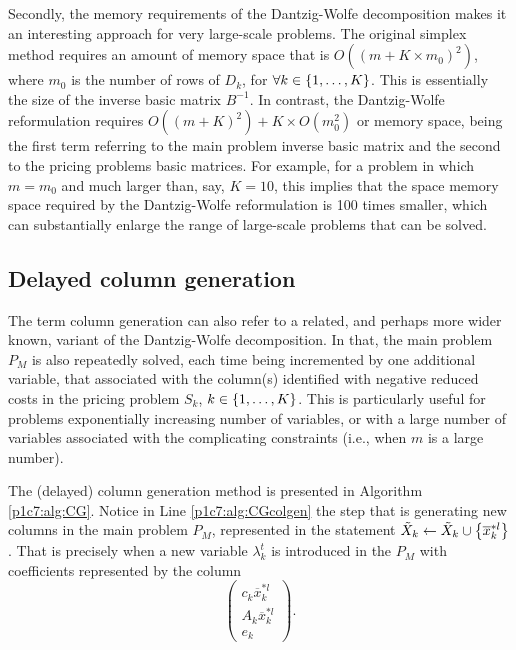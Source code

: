 Secondly, the memory requirements of the Dantzig-Wolfe decomposition makes it an interesting approach for very large-scale problems. The original simplex method requires an amount of memory space that is $O((m + K \times m_0)^2)$, where $m_0$ is the number of rows of $D_k$, for $\forall k \in \left\{ 1,\dots, K \right \}$. This is essentially the size of the inverse basic matrix $B^{-1}$. In contrast, the Dantzig-Wolfe reformulation requires $O((m + K)^2) + K \times O(m_0^2)$ or memory space, being the first term referring to the main problem inverse basic matrix and the second to the pricing problems basic matrices. For example, for a problem in which $m = m_0$ and much larger than, say, $K=10$, this implies that the space memory space required by the Dantzig-Wolfe reformulation is 100 times smaller, which can substantially enlarge the range of large-scale problems that can be solved.


\subsection{Delayed column generation}
 
The term column generation can also refer to a related, and perhaps more wider known, variant of the Dantzig-Wolfe decomposition. In that, the main problem $P_M$ is also repeatedly solved, each time being incremented by one additional variable, that associated with the column(s) identified with negative reduced costs in the pricing problem $S_k$, $k \in \left\{ 1,\dots,K \right \}$. This is particularly useful for problems exponentially increasing number of variables, or with a large number of variables associated with the complicating constraints (i.e., when $m$ is a large number).

The (delayed) column generation method is presented in Algorithm \ref{p1c7:alg:CG}. Notice in Line \ref{p1c7:alg:CGcolgen} the step that is generating new columns in the main problem $P_M$, represented in the statement $\tilde{X}_k \gets \tilde{X}_k \cup \left\{ \overline{x}^{*l}_k \right \}$. That is precisely when a new variable $\lambda_k^{t}$ is introduced in the $P_M$ with coefficients represented by the column
\begin{equation*}
	\begin{pmatrix}
            c_k\overline{x}_k^{*l}\\
            A_k\overline{x}_k^{*l}\\
            e_k
    \end{pmatrix}.
\end{equation*}

